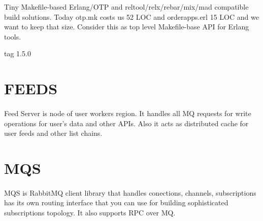 \documentclass[11pt]{article}
\begin{document}
Tiny Makefile-based Erlang/OTP and reltool/relx/rebar/mix/mad compatible
build solutions. Today otp.mk costs us 52 LOC and orderapps.erl 15 LOC
and we want to keep that size. Consider this as top level Makefile-base
API for Erlang tools.

 tag 1.5.0

\section*{FEEDS}
\paragraph{}
Feed Server is node of user workers region. It handles all MQ
requests for write operations for user's data and other APIs.
Also it acts as distributed cache for user feeds and other list chains.



\section*{MQS}
\paragraph{}
MQS is RabbitMQ client library that handles conections, channels,
subscriptions has its own routing interface that you can use for building
sophisticated subscriptions topology. It also supports RPC over MQ.







\qquad

\end{document}
